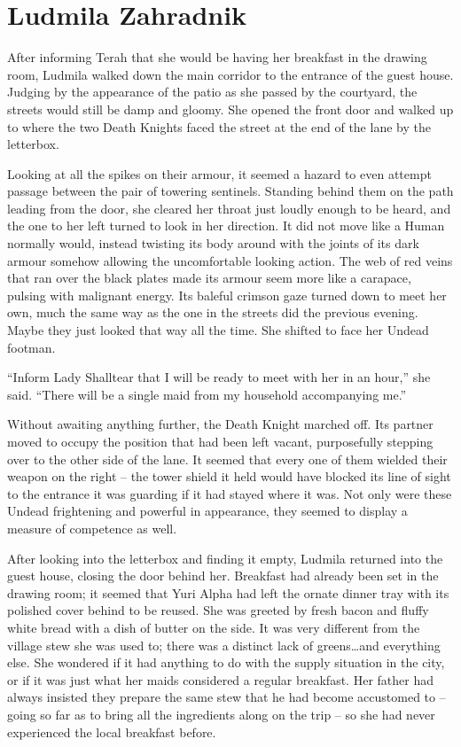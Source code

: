 \chapter{Ludmila Zahradnik}

After informing Terah that she would be having her breakfast in the drawing room, Ludmila walked down the main corridor to the entrance of the guest house. Judging by the appearance of the patio as she passed by the courtyard, the streets would still be damp and gloomy. She opened the front door and walked up to where the two Death Knights faced the street at the end of the lane by the letterbox.

 

Looking at all the spikes on their armour, it seemed a hazard to even attempt passage between the pair of towering sentinels. Standing behind them on the path leading from the door, she cleared her throat just loudly enough to be heard, and the one to her left turned to look in her direction. It did not move like a Human normally would, instead twisting its body around with the joints of its dark armour somehow allowing the uncomfortable looking action. The web of red veins that ran over the black plates made its armour seem more like a carapace, pulsing with malignant energy. Its baleful crimson gaze turned down to meet her own, much the same way as the one in the streets did the previous evening. Maybe they just looked that way all the time. She shifted to face her Undead footman.

 

“Inform Lady Shalltear that I will be ready to meet with her in an hour,” she said. “There will be a single maid from my household accompanying me.”

 

Without awaiting anything further, the Death Knight marched off. Its partner moved to occupy the position that had been left vacant, purposefully stepping over to the other side of the lane. It seemed that every one of them wielded their weapon on the right – the tower shield it held would have blocked its line of sight to the entrance it was guarding if it had stayed where it was. Not only were these Undead frightening and powerful in appearance, they seemed to display a measure of competence as well.

 

After looking into the letterbox and finding it empty, Ludmila returned into the guest house, closing the door behind her. Breakfast had already been set in the drawing room; it seemed that Yuri Alpha had left the ornate dinner tray with its polished cover behind to be reused. She was greeted by fresh bacon and fluffy white bread with a dish of butter on the side. It was very different from the village stew she was used to; there was a distinct lack of greens…and everything else. She wondered if it had anything to do with the supply situation in the city, or if it was just what her maids considered a regular breakfast. Her father had always insisted they prepare the same stew that he had become accustomed to – going so far as to bring all the ingredients along on the trip – so she had never experienced the local breakfast before.

